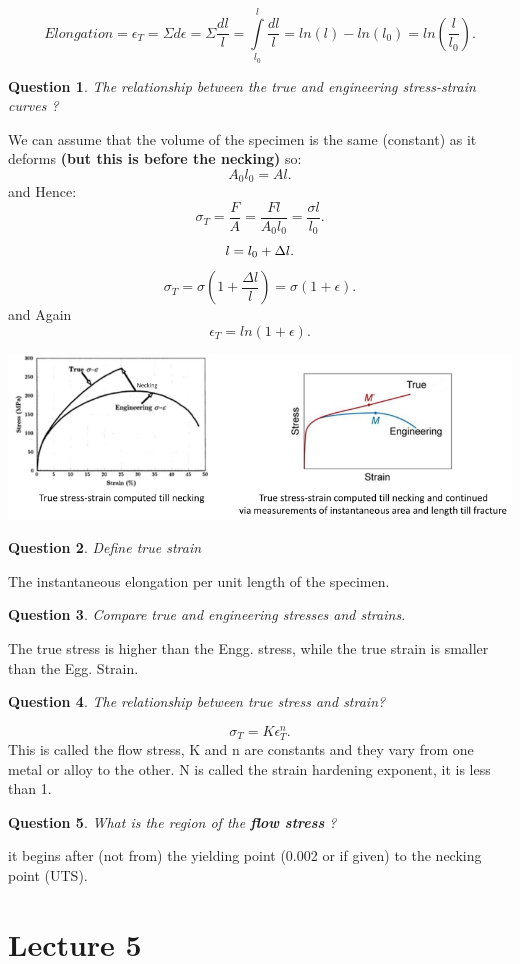 \documentclass[13]{article}
\newtheorem{exer}{Question}
\begin{document}
\[
	Elongation = \epsilon_T = \Sigma d\epsilon = \Sigma \frac{dl}{l}=\int \limits_{l_0}^{l} \frac{dl}{l} = ln(l)-ln(l_0) = ln( \frac{l}{l_0})  
.\] 
\begin{exer}
The relationship between the true and engineering stress-strain curves ?
\end{exer}
We can assume that the volume of the specimen is the same (constant) as it deforms \textbf{(but this is before the necking)}  so:
\[
A_0l_0 = Al
.\] 
and Hence:
\[
\sigma_T = \frac{F}{A} = \frac{Fl}{A_0l_0} = \frac{\sigma l}{l_0}
.\] 
\[
l = l_0+\Delta l \\ 
.\] 
\[
\sigma_T = \sigma (1+\frac{\Delta l}{l}) = \sigma (1+ \epsilon)
.\]
and Again
\[
	\epsilon_T = ln(1+ \epsilon)
.\] 
\begin{center}
\includegraphics[scale=0.5]{figures/8.png}
\end{center}
\begin{exer}
Define true strain
\end{exer}
The instantaneous elongation per unit length of the specimen.
\begin{exer}
Compare true and engineering stresses and strains.
\end{exer}
The true stress is higher than the Engg. stress, while the true strain is smaller than the Egg. Strain.
\begin{exer}
The relationship between true stress and strain?
\end{exer}
\[
\sigma_T = K \epsilon_T^n
.\] 
This is called the flow stress, K and n are constants and they vary from one metal or alloy to the other. N is called the strain hardening exponent, it is less than 1. 
\begin{exer}
What is the region of the \textbf{flow stress} ?
\end{exer}
it begins after (not from) the yielding point (0.002 or if given) to the necking point (UTS). 





\section{Lecture 5}
\end{document}
